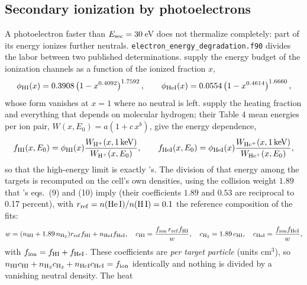 \subsection{Secondary ionization by photoelectrons}
\label{sec:radiation:secondary}

A photoelectron faster than $E_{\rm sec} = 30$\,eV does not thermalize
completely: part of its energy ionizes further neutrals.
\texttt{electron\_energy\_degradation.f90} divides the labor between two
published determinations. \citet{Shull1985} supply
the energy budget of the ionization channels as a function of the ionized
fraction $x$,
\begin{equation}
\phi_{\rm HI}(x) = 0.3908\left(1-x^{0.4092}\right)^{1.7592},
\qquad
\phi_{\rm HeI}(x) = 0.0554\left(1-x^{0.4614}\right)^{1.6660},
\label{eq:rad:svs85}
\end{equation}
whose form vanishes at $x=1$ where no neutral is left. \citet{Dalgarno1999}
supply the heating fraction and everything that
depends on molecular hydrogen; their Table 4 mean energies per ion pair,
$W(x,E_0) = a(1+c\,x^{b})$, give the energy dependence,
\begin{equation}
f_{\rm HI}(x,E_0) = \phi_{\rm HI}(x)\frac{W_{\rm H^+}(x,1\,{\rm keV})}
                                          {W_{\rm H^+}(x,E_0)},
\qquad
f_{\rm HeI}(x,E_0) = \phi_{\rm HeI}(x)\frac{W_{\rm He^+}(x,1\,{\rm keV})}
                                            {W_{\rm He^+}(x,E_0)},
\label{eq:rad:sec_energy}
\end{equation}
so that the high-energy limit is exactly \citeauthor{Shull1985}'s. The
division of that energy among the targets is recomputed on the cell's own
densities, using the collision weight $1.89$ that \citeauthor{Dalgarno1999}'s
eqs.~(9) and (10) imply (their coefficients $1.89$ and $0.53$ are reciprocal
to 0.17 percent), with $r_{\rm ref} = n({\rm He\,I})/n({\rm H\,I}) = 0.1$
the reference composition of the fits:
\begin{equation}
w = (n_{\rm HI}+1.89\,n_{\rm H_2})r_{\rm ref}f_{\rm HI} + n_{\rm HeI}f_{\rm HeI},
\quad
c_{\rm HI} = \frac{f_{\rm ion}\,r_{\rm ref}f_{\rm HI}}{w},
\quad
c_{\rm H_2} = 1.89\,c_{\rm HI},
\quad
c_{\rm HeI} = \frac{f_{\rm ion}f_{\rm HeI}}{w},
\label{eq:rad:sec_split}
\end{equation}
with $f_{\rm ion} = f_{\rm HI}+f_{\rm HeI}$. These coefficients are
\emph{per target particle} (units cm$^{3}$), so
$n_{\rm HI}c_{\rm HI}+n_{\rm H_2}c_{\rm H_2}+n_{\rm HeI}c_{\rm HeI}=f_{\rm ion}$
identically and nothing is divided by a vanishing neutral density. The heat
